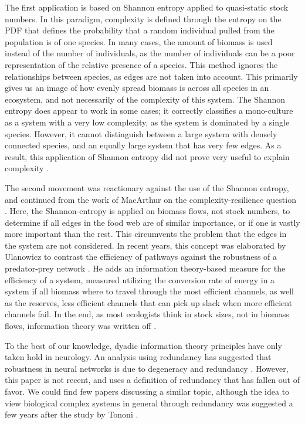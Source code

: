 \documentclass[../main.tex]{subfiles}
\begin{document}
The first application is based on Shannon entropy applied to quasi-static stock numbers.
In this paradigm, complexity is defined through the entropy on the PDF that defines the probability that a random individual pulled from the population is of one species.
In many cases, the amount of biomass is used instead of the number of individuals, as the number of individuals can be a poor representation of the relative presence of a species.
This method ignores the relationships between species, as edges are not taken into account.
This primarily gives us an image of how evenly spread biomass is across all species in an ecosystem, and not necessarily of the complexity of this system.
The Shannon entropy does appear to work in some cases; it correctly classifies a mono-culture as a system with a very low complexity, as the system is dominated by a single species.
However, it cannot distinguish between a large system with densely connected species, and an equally large system that has very few edges.
As a result, this application of Shannon entropy did not prove very useful to explain complexity \cite{ulanowicz2001information}.

The second movement was reactionary against the use of the Shannon entropy, and continued from the work of MacArthur on the complexity-resilience question \cite{ulanowicz2009quantifying}.
Here, the Shannon-entropy is applied on biomass flows, not stock numbers, to determine if all edges in the food web are of similar importance, or if one is vastly more important than the rest.
This circumvents the problem that the edges in the system are not considered.
In recent years, this concept was elaborated by Ulanowicz to contrast the efficiency of pathways against the robustness of a predator-prey network \cite{ulanowicz2009quantifying}.
He adds an information theory-based measure for the efficiency of a system, measured utilizing the conversion rate of energy in a system if all biomass where to travel through the most efficient channels, as well as the reserves, less efficient channels that can pick up slack when more efficient channels fail.
In the end, as most ecologists think in stock sizes, not in biomass flows, information theory was written off \cite{ulanowicz2001information}.

To the best of our knowledge, dyadic information theory principles have only taken hold in neurology.
An analysis using redundancy has suggested that robustness in neural networks is due to degeneracy and redundancy \cite{tononi1999measures}.
However, this paper is not recent, and uses a definition of redundancy that has fallen out of favor.
We could find few papers discussing a similar topic, although the idea to view biological complex systems in general through redundancy was suggested a few years after the study by Tononi \cite{edelman2001degeneracy}.
\end{document}
